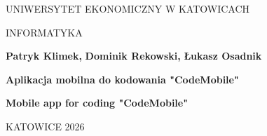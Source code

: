 
\pagestyle{empty}
\noindent
\begin{center}
    UNIWERSYTET EKONOMICZNY W KATOWICACH
\end{center}

\begin{center}
    INFORMATYKA
\end{center}

\vfill
\begin{center}
    \textbf{Patryk Klimek,}
    \textbf{Dominik Rekowski,}
    \textbf{Łukasz Osadnik}
\end{center}
\vfill

\begin{center}
    \Large
	\textbf{Aplikacja mobilna do kodowania "CodeMobile"}
\end{center}

\begin{center}
	\textbf{Mobile app for coding "CodeMobile"}
\end{center}

\vfill
\vfill
\vfill


\vfill
\begin{center}
    KATOWICE 2026
\end{center}

\newpage 

\tableofcontents


